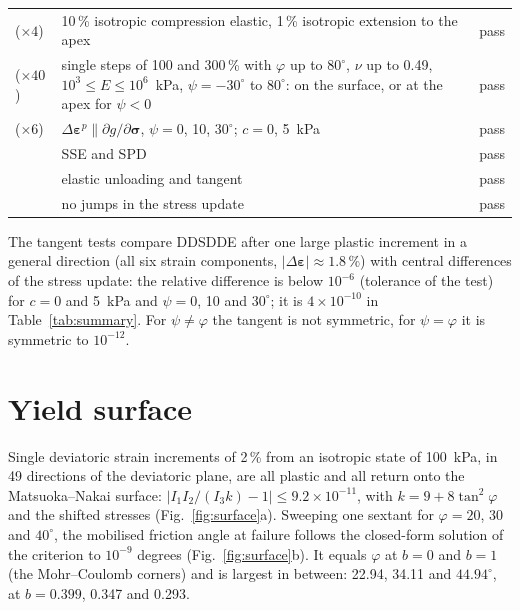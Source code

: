 \documentclass[11pt,a4paper]{article}
\begin{document}
\begin{table}[h]
\begin{tabularx}{\textwidth}{@{}>{\raggedright\arraybackslash}p{}Lc@{}}
     ($\times 4$) & 10\,\% isotropic compression elastic, 1\,\% isotropic extension to the apex & pass \\
     ($\times 40$) & single steps of 100 and 300\,\% with $\varphi$ up to $80^\circ$, $\nu$ up to 0.49, $10^3 \le E \le 10^6$~kPa, $\psi = -30^\circ$ to $80^\circ$: on the surface, or at the apex for $\psi < 0$ & pass \\
     ($\times 6$) & $\Delta\boldsymbol{\varepsilon}^p \parallel \partial g/\partial\boldsymbol{\sigma}$, $\psi = 0$, 10, $30^\circ$; $c = 0$, 5~kPa & pass \\
     & SSE and SPD & pass \\
     & elastic unloading and tangent & pass \\
     & no jumps in the stress update & pass \\
    \bottomrule
  \end{tabularx}
\end{table}

The tangent tests compare DDSDDE after one large plastic increment in a general direction (all six
strain components, $|\Delta\boldsymbol{\varepsilon}| \approx 1.8\,\%$) with central differences of
the stress update: the relative difference is below $10^{-6}$ (tolerance of the test) for
$c = 0$ and 5~kPa and $\psi = 0$, 10 and $30^\circ$; it is $4\times10^{-10}$ in
Table~\ref{tab:summary}. For $\psi \ne \varphi$ the tangent is not symmetric, for
$\psi = \varphi$ it is symmetric to $10^{-12}$.

\section{Yield surface}

Single deviatoric strain increments of 2\,\% from an isotropic state of 100~kPa, in 49 directions
of the deviatoric plane, are all plastic and all return onto the Matsuoka--Nakai surface:
$|I_1 I_2/(I_3 k) - 1| \le 9.2\times10^{-11}$, with $k = 9 + 8\tan^2\varphi$ and the
shifted stresses (Fig.~\ref{fig:surface}a). Sweeping one sextant for $\varphi = 20$, 30 and
$40^\circ$, the mobilised friction angle at failure follows the closed-form solution of the
criterion to $10^{-9}$ degrees (Fig.~\ref{fig:surface}b). It equals $\varphi$ at $b = 0$ and
$b = 1$ (the Mohr--Coulomb corners) and is largest in between: 22.94, 34.11 and $44.94^\circ$, at
$b = 0.399$, 0.347 and 0.293.
\end{document}
